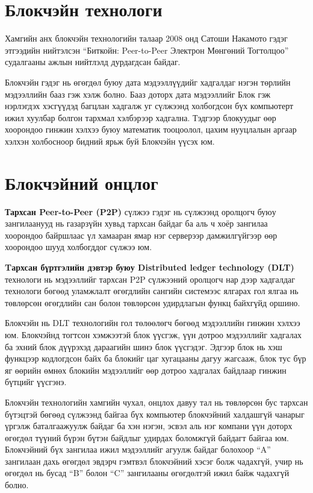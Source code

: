 \section{Блокчэйн технологи}
Хамгийн анх блокчэйн технологийн талаар 2008 онд Сатоши Накамото
гэдэг этгээдийн нийтэлсэн “Биткойн: Peer-to-Peer Электрон Мөнгөний Тогтолцоо” судалгааны ажлын нийтлэлд дурдагдсан байдаг.

Блокчэйн гэдэг нь өгөгдөл буюу дата мэдээллүүдийг хадгалдаг нэгэн төрлийн мэдээллийн бааз гэж хэлж болно. Бааз доторх дата мэдээллийг Блок гэж нэрлэгдэх хэсгүүдэд багцлан хадгалж уг сүлжээнд холбогдсон бүх компьютерт ижил хуулбар болгон тархмал хэлбэрээр хадгална. Тэдгээр блокуудыг өөр хоорондоо гинжин хэлхээ буюу математик тооцоолол, цахим нууцлалын аргаар хэлхэн холбосноор бидний ярьж буй Блокчэйн үүсэх юм.

\section{Блокчэйний онцлог}
\textbf{Тархсан Peer-to-Peer (P2P)} сүлжээ гэдэг нь сүлжээнд оролцогч буюу зангилаанууд нь газарзүйн хувьд тархсан байдаг ба аль ч хоёр зангилаа хоорондоо байршлаас үл хамааран ямар нэг серверээр дамжилгүйгээр өөр хоорондоо шууд холбогддог сүлжээ юм.

\textbf{Tархсан бүртгэлийн дэвтэр буюу Distributed ledger technology (DLT)} технологи нь мэдээллийг тархсан P2P сүлжээний оролцогч нар дээр хадгалдаг технологи бөгөөд уламжлалт өгөгдлийн сангийн системээс ялгарах гол ялгаа нь төвлөрсөн өгөгдлийн сан болон төвлөрсөн удирдлагын функц байхгүйд оршино.

Блокчэйн нь DLT технологийн гол төлөөлөгч бөгөөд мэдээллийн гинжин хэлхээ юм. Блокчэйнд тогтсон хэмжээтэй блок үүсгэж, үүн дотроо мэдээллийг хадгалах ба эхний блок дүүрэхэд дараагийн шинэ блок үүсгэдэг. Эдгээр блок нь хэш функцээр кодлогдсон байх ба блокийг цаг хугацааны дагуу жагсааж, блок тус бүр яг өөрийн өмнөх блокийн мэдээллийг өөр дотроо хадгалах байдлаар гинжин бүтцийг үүсгэнэ.

Блокчэйн технологийн хамгийн чухал, онцлох давуу тал нь төвлөрсөн бус тархсан бүтэцтэй бөгөөд сүлжээнд байгаа бүх компьютер блокчэйний халдашгүй чанарыг үргэлж баталгаажуулж байдаг ба хэн нэгэн, эсвэл аль нэг компани үүн доторх өгөгдөл түүний бүрэн бүтэн байдлыг удирдах боломжгүй байдагт байгаа юм. Блокчэйний бүх зангилаа ижил мэдээллийг агуулж байдаг болохоор “A” зангилаан дахь өгөгдөл эвдэрч гэмтвэл блокчэйний хэсэг болж чадахгүй, учир нь өгөгдөл нь бусад “B” болон “C” зангилааны өгөгдөлтэй ижил байж чадахгүй болно.

